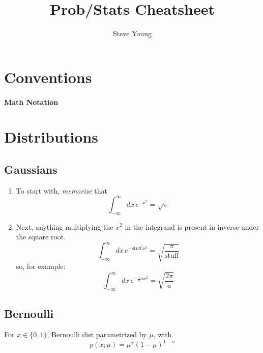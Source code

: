 \documentclass[11pt]{article}
\title{Prob/Stats Cheatsheet}
\author{Steve Young}
\begin{document}
\maketitle

\section{Conventions}
\paragraph{Math Notation}



\section{Distributions}
\subsection{Gaussians}

\begin{enumerate}
  \item To start with, \emph{memorize} that
  \begin{equation}
    \boxed{\int_{-\infty}^{\infty} dx \, e^{-x^2} = \sqrt{\pi}}
  \end{equation}

  \item Next, anything multiplying the $x^2$ in the integrand is present in inverse
  under the square root.
  \begin{equation}
    \int_{-\infty}^{\infty} dx \, e^{-\textrm{stuff}\, x^2} =
    \sqrt{\frac{\pi}{\textrm{stuff}}}
  \end{equation}
  so, for example:
  \begin{equation}
    \int_{-\infty}^{\infty} dx \, e^{-\frac{1}{2} a x^2} =
    \sqrt{\frac{2 \pi}{a}}
  \end{equation}

\end{enumerate}

\subsection{Bernoulli}
For $x \in \{0, 1\}$, Bernoulli dist parametrized by $\mu$, with
\begin{equation}
  p(x; \mu) = \mu^x (1-\mu)^{1-x}
\end{equation}
\end{document}

